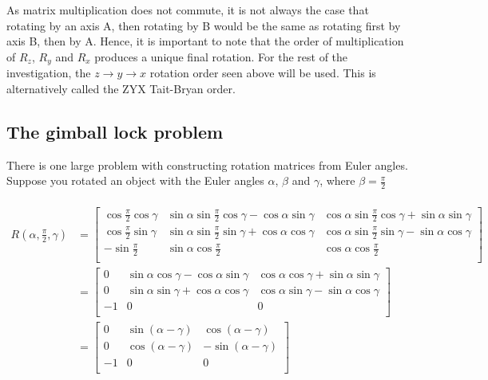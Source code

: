 \documentclass[12pt, a4paper]{article}
\begin{document}
As matrix multiplication does not commute, it is not always the case that
rotating by an axis A, then rotating by B would be the same as rotating first by
axis B, then by A. Hence, it is important to note that the order of
multiplication of $R_z$, $R_y$ and $R_x$ produces a unique final rotation. For
the rest of the investigation, the $z \to y \to x$ rotation order seen above
will be used. This is alternatively called the ZYX Tait-Bryan order.

\subsection{The gimball lock problem}
There is one large problem with constructing rotation matrices from Euler
angles. Suppose you rotated an object with the Euler angles
$\alpha$, $\beta$ and $\gamma$, where $\beta=\frac{\pi}{2}$

\begin{align*} \\
    R(\alpha, \frac{\pi}{2}, \gamma)
     & = \begin{bmatrix}
             \cos\frac{\pi}{2}\cos\gamma & \sin\alpha\sin\frac{\pi}{2}\cos\gamma - \cos\alpha\sin\gamma & \cos\alpha\sin\frac{\pi}{2}\cos\gamma + \sin\alpha\sin\gamma \\
             \cos\frac{\pi}{2}\sin\gamma & \sin\alpha\sin\frac{\pi}{2}\sin\gamma + \cos\alpha\cos\gamma & \cos\alpha\sin\frac{\pi}{2}\sin\gamma - \sin\alpha\cos\gamma \\
             -\sin\frac{\pi}{2}          & \sin\alpha\cos\frac{\pi}{2}                                  & \cos\alpha\cos\frac{\pi}{2}                                  \\
         \end{bmatrix}
    \\
     & = \begin{bmatrix}
             0  & \sin\alpha\cos\gamma - \cos\alpha\sin\gamma & \cos\alpha\cos\gamma + \sin\alpha\sin\gamma \\
             0  & \sin\alpha\sin\gamma + \cos\alpha\cos\gamma & \cos\alpha\sin\gamma - \sin\alpha\cos\gamma \\
             -1 & 0                                           & 0                                           \\
         \end{bmatrix}
    \\
     & = \begin{bmatrix}
             0  & \sin(\alpha - \gamma) & \cos(\alpha - \gamma)  \\
             0  & \cos(\alpha - \gamma) & -\sin(\alpha - \gamma) \\
             -1 & 0                     & 0                      \\
         \end{bmatrix}
\end{align*} \\
\end{document}
